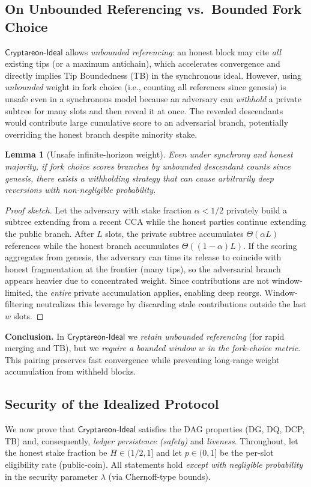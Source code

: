 \documentclass[11pt]{article}
\newtheorem{lemma}[theorem]{Lemma}
\newcommand{\ProjIdeal}{\ensuremath{\mathsf{Cryptareon\text{-}Ideal}}\xspace}
\begin{document}
\subsection{On Unbounded Referencing vs.\ Bounded Fork Choice}
\label{subsec:ideal-window-justification}
\ProjIdeal allows \emph{unbounded referencing}: an honest block may cite \emph{all} existing tips (or a maximum antichain), which accelerates convergence and directly implies Tip Boundedness (TB) in the synchronous ideal.
However, using \emph{unbounded} weight in fork choice (i.e., counting all references since genesis) is unsafe even in a synchronous model because an adversary can \emph{withhold} a private subtree for many slots and then reveal it at once. The revealed descendants would contribute large cumulative score to an adversarial branch, potentially overriding the honest branch despite minority stake.

\begin{lemma}[Unsafe infinite-horizon weight]
Even under synchrony and honest majority, if fork choice scores branches by \emph{unbounded} descendant counts since genesis, there exists a withholding strategy that can cause arbitrarily deep reversions with non-negligible probability.
\end{lemma}

\begin{proof}[Proof sketch]
Let the adversary with stake fraction $\alpha<1/2$ privately build a subtree extending from a recent CCA while the honest parties continue extending the public branch. After $L$ slots, the private subtree accumulates $\Theta(\alpha L)$ references while the honest branch accumulates $\Theta((1-\alpha)L)$. If the scoring aggregates from genesis, the adversary can time its release to coincide with honest fragmentation at the frontier (many tips), so the adversarial branch appears heavier due to concentrated weight. Since contributions are not window-limited, the \emph{entire} private accumulation applies, enabling deep reorgs. Window-filtering neutralizes this leverage by discarding stale contributions outside the last $w$ slots.
\end{proof}

\noindent\textbf{Conclusion.} In \ProjIdeal we \emph{retain unbounded referencing} (for rapid merging and TB), but we \emph{require a bounded window $w$ in the fork-choice metric}. This pairing preserves fast convergence while preventing long-range weight accumulation from withheld blocks.

\subsection{Security of the Idealized Protocol}
\label{subsec:ideal-security}
We now prove that \ProjIdeal satisfies the DAG properties (DG, DQ, DCP, TB) and, consequently, \emph{ledger persistence (safety)} and \emph{liveness}. Throughout, let the honest stake fraction be $H\in(1/2,1]$ and let $p\in(0,1]$ be the per-slot eligibility rate (public-coin). All statements hold \emph{except with negligible probability} in the security parameter $\lambda$ (via Chernoff-type bounds).
\end{document}
